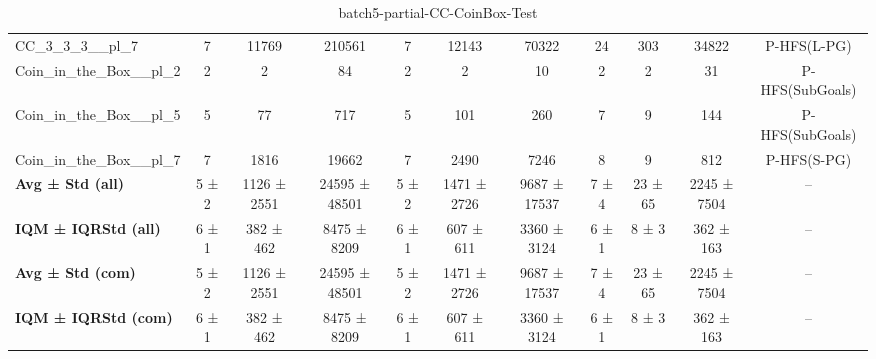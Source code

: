 \begin{table}[!ht]
\begin{tabular}{l|ccc|ccc|cccc}
CC\_3\_3\_3\_\_pl\_7 & 7 & 11769 & 210561 & 7 & 12143 & 70322 & 24 & 303 & 34822 & P-HFS(L-PG) \\
Coin\_in\_the\_Box\_\_pl\_2 & 2 & 2 & 84 & 2 & 2 & 10 & 2 & 2 & 31 & P-HFS(SubGoals) \\
Coin\_in\_the\_Box\_\_pl\_5 & 5 & 77 & 717 & 5 & 101 & 260 & 7 & 9 & 144 & P-HFS(SubGoals) \\
Coin\_in\_the\_Box\_\_pl\_7 & 7 & 1816 & 19662 & 7 & 2490 & 7246 & 8 & 9 & 812 & P-HFS(S-PG) \\
\hline
\textbf{Avg ± Std (all)} & 5 ± 2 & 1126 ± 2551 & 24595 ± 48501 & 5 ± 2 & 1471 ± 2726 & 9687 ± 17537 & 7 ± 4 & 23 ± 65 & 2245 ± 7504 & -- \\
\textbf{IQM ± IQRStd (all)} & 6 ± 1 & 382 ± 462 & 8475 ± 8209 & 6 ± 1 & 607 ± 611 & 3360 ± 3124 & 6 ± 1 & 8 ± 3 & 362 ± 163 & -- \\
\textbf{Avg ± Std (com)} & 5 ± 2 & 1126 ± 2551 & 24595 ± 48501 & 5 ± 2 & 1471 ± 2726 & 9687 ± 17537 & 7 ± 4 & 23 ± 65 & 2245 ± 7504 & -- \\
\textbf{IQM ± IQRStd (com)} & 6 ± 1 & 382 ± 462 & 8475 ± 8209 & 6 ± 1 & 607 ± 611 & 3360 ± 3124 & 6 ± 1 & 8 ± 3 & 362 ± 163 & -- \\
\end{tabular}
\caption{batch5-partial-CC-CoinBox-Test}
\label{tab:batch5_partial_CC-CoinBox_comparison_test}
\end{table}

